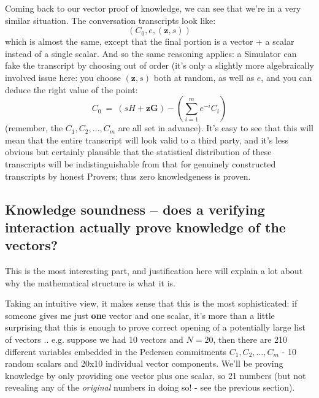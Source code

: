 \documentclass[10pt,a4paper]{article}
\begin{document}
Coming back to our vector proof of knowledge, we can see that we're in a
very similar situation. The conversation transcripts look like:
\[(C_0, e, (\mathbf{z}, s))\]
which is almost the same, except that the final portion is a vector + a
scalar instead of a single scalar. And so the same reasoning applies: a
Simulator can fake the transcript by choosing out of order (it's only a
slightly more algebraically involved issue here: you choose $(\textbf{z},
s)$ both at random, as well as $e$, and you can deduce the right value of
the point:
\[C_0 \ = \ \left(sH + \mathbf{z}\mathbf{G}\right)-\left(\sum\limits_{i=1}^{m}e^{-i}C_{i}\right)\]
(remember, the $C_1, C_2, \ldots ,C_m$ are all set in advance). It's easy to see that this will
mean that the entire transcript will look valid to a third party, and
it's less obvious but certainly plausible that the statistical
distribution of these transcripts will be indistinguishable from that
for genuinely constructed transcripts by honest Provers; thus zero
knowledgeness is proven.

\hypertarget{knowledge-soundness-does-a-verifying-interaction-actually-prove-knowledge-of-the-vectors}{%
\subsection[Knowledge soundness -- does a verifying interaction actually
prove knowledge of the
vectors?]{\texorpdfstring{\protect\hypertarget{anchor-29}{}{}Knowledge
soundness -- does a verifying interaction actually prove knowledge of
the
vectors?}{Knowledge soundness -- does a verifying interaction actually prove knowledge of the vectors?}}\label{knowledge-soundness-does-a-verifying-interaction-actually-prove-knowledge-of-the-vectors}}

This is the most interesting part, and justification here will explain a
lot about why the mathematical structure is what it is.

Taking an intuitive view, it makes sense that this is the most
sophisticated: if someone gives me just \textbf{one }vector and one
scalar, it's more than a little surprising that this is enough to prove
correct opening of a potentially large list of vectors .. e.g. suppose
we had 10 vectors and $N = 20$, then there are 210 different variables
embedded in the Pedersen commitments $C_1, C_2, \ldots ,C_m$ - 10 random scalars and 20x10
individual vector components. We'll be proving knowledge by only
providing one vector plus one scalar, so 21 numbers (but not revealing
any of the \emph{original} numbers in doing so! - see the previous
section).
\end{document}

